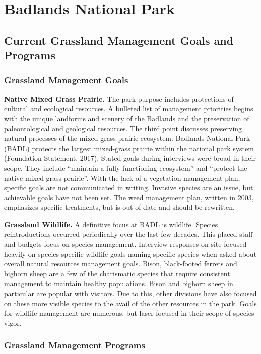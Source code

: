 \section{Badlands National Park}

\subsection{Current Grassland Management Goals and Programs}

\subsubsection{Grassland Management Goals}

\textbf{Native Mixed Grass Prairie.} The park purpose includes protections of cultural and ecological resources. 
A bulleted list of management priorities begins with the unique landforms and scenery of the Badlands and the preservation of paleontological and geological resources. 
The third point discusses preserving natural processes of the mixed-grass prairie ecosystem.
Badlands National Park (BADL) protects the largest mixed-grass prairie within the national park system (Foundation Statement, 2017).
Stated goals during interviews were broad in their scope. 
They include ``maintain a fully functioning ecosystem'' and ``protect the native mixed-grass prairie''. 
With the lack of a vegetation management plan, specific goals are not communicated in writing.
Invasive species are an issue, but achievable goals have not been set. 
The weed management plan, written in 2003, emphasizes specific treatments, but is out of date and should be rewritten.

\textbf{Grassland Wildlife.} A definitive focus at BADL is wildlife.
Species reintroductions occurred periodically over the last few decades.
This placed staff and budgets focus on species management. 
Interview responses on site focused heavily on species specific wildlife goals naming specific species when asked about overall natural resources management goals. 
Bison, black-footed ferrets and bighorn sheep are a few of the charismatic species that require consistent management to maintain healthy populations. 
Bison and bighorn sheep in particular are popular with visitors. 
Due to this, other divisions have also focused on these more visible species to the avail of the other resources in the park. 
Goals for wildlife management are numerous, but laser focused in their scope of species vigor.

\subsubsection{Grassland Management Programs}

